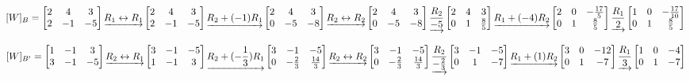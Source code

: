 \documentclass[
  11,
]{article}
\begin{document}
\[
  [W]_B = 
  \left[\begin{matrix}2 & 4 & 3\\2 & -1 & -5\end{matrix}\right]
\underrightarrow{ R_{1} \leftrightarrow R_{1} }
\left[\begin{matrix}2 & 4 & 3\\2 & -1 & -5\end{matrix}\right]
\underrightarrow{ R_2 + (-1)R_1 }
\left[\begin{matrix}2 & 4 & 3\\0 & -5 & -8\end{matrix}\right]
\underrightarrow{ R_{2} \leftrightarrow R_{2} }
\left[\begin{matrix}2 & 4 & 3\\0 & -5 & -8\end{matrix}\right]
\underrightarrow{ \frac{R_2}{-5} }
\left[\begin{matrix}2 & 4 & 3\\0 & 1 & \frac{8}{5}\end{matrix}\right]
\underrightarrow{ R_1 + (-4)R_2 }
\\
\left[\begin{matrix}2 & 0 & - \frac{17}{5}\\0 & 1 & \frac{8}{5}\end{matrix}\right]
\underrightarrow{ \frac{R_1}{2} }
\left[\begin{matrix}1 & 0 & - \frac{17}{10}\\0 & 1 & \frac{8}{5}\end{matrix}\right]
  \]

\[
  [W]_{B'} = \left[\begin{matrix}1 & -1 & 3\\3 & -1 & -5\end{matrix}\right]
\underrightarrow{ R_{2} \leftrightarrow R_{1} }
\left[\begin{matrix}3 & -1 & -5\\1 & -1 & 3\end{matrix}\right]
\underrightarrow{ R_2 + (- \frac{1}{3})R_1 }
\left[\begin{matrix}3 & -1 & -5\\0 & - \frac{2}{3} & \frac{14}{3}\end{matrix}\right]
\underrightarrow{ R_{2} \leftrightarrow R_{2} }
\left[\begin{matrix}3 & -1 & -5\\0 & - \frac{2}{3} & \frac{14}{3}\end{matrix}\right]
\underrightarrow{ \frac{R_2}{- \frac{2}{3}} }
\left[\begin{matrix}3 & -1 & -5\\0 & 1 & -7\end{matrix}\right]
\underrightarrow{ R_1 + (1)R_2 }
\\
\left[\begin{matrix}3 & 0 & -12\\0 & 1 & -7\end{matrix}\right]
\underrightarrow{ \frac{R_1}{3} }
\left[\begin{matrix}1 & 0 & -4\\0 & 1 & -7\end{matrix}\right]
  \]
\end{document}
